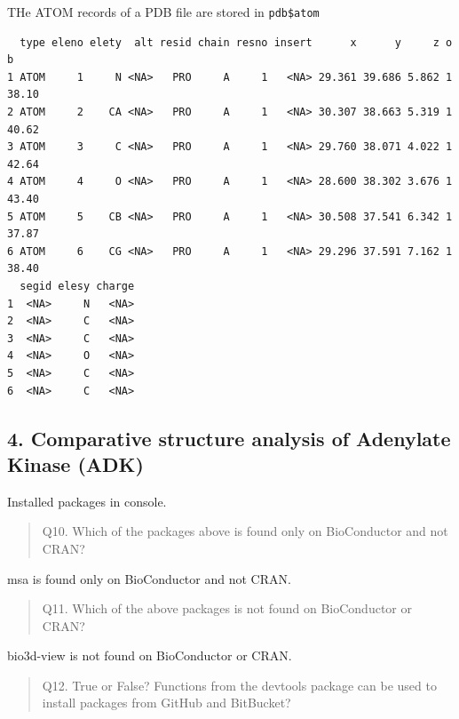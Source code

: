 \documentclass[
  letterpaper,
  DIV=11,
  numbers=noendperiod]{scrartcl}
\newenvironment{Shaded}{\begin{snugshade}}{\end{snugshade}}
\newcommand{\FunctionTok}[1]{\textcolor[rgb]{0.28,0.35,0.67}{#1}}
\newcommand{\NormalTok}[1]{\textcolor[rgb]{0.00,0.23,0.31}{#1}}
\newcommand{\SpecialCharTok}[1]{\textcolor[rgb]{0.37,0.37,0.37}{#1}}
\begin{document}
THe ATOM records of a PDB file are stored in \texttt{pdb\$atom}

\begin{Shaded}
\end{Shaded}

\begin{verbatim}
  type eleno elety  alt resid chain resno insert      x      y     z o     b
1 ATOM     1     N <NA>   PRO     A     1   <NA> 29.361 39.686 5.862 1 38.10
2 ATOM     2    CA <NA>   PRO     A     1   <NA> 30.307 38.663 5.319 1 40.62
3 ATOM     3     C <NA>   PRO     A     1   <NA> 29.760 38.071 4.022 1 42.64
4 ATOM     4     O <NA>   PRO     A     1   <NA> 28.600 38.302 3.676 1 43.40
5 ATOM     5    CB <NA>   PRO     A     1   <NA> 30.508 37.541 6.342 1 37.87
6 ATOM     6    CG <NA>   PRO     A     1   <NA> 29.296 37.591 7.162 1 38.40
  segid elesy charge
1  <NA>     N   <NA>
2  <NA>     C   <NA>
3  <NA>     C   <NA>
4  <NA>     O   <NA>
5  <NA>     C   <NA>
6  <NA>     C   <NA>
\end{verbatim}

\hypertarget{comparative-structure-analysis-of-adenylate-kinase-adk}{%
\subsection{4. Comparative structure analysis of Adenylate Kinase
(ADK)}\label{comparative-structure-analysis-of-adenylate-kinase-adk}}

Installed packages in console.

\begin{quote}
Q10. Which of the packages above is found only on BioConductor and not
CRAN?
\end{quote}

msa is found only on BioConductor and not CRAN.

\begin{quote}
Q11. Which of the above packages is not found on BioConductor or CRAN?
\end{quote}

bio3d-view is not found on BioConductor or CRAN.

\begin{quote}
Q12. True or False? Functions from the devtools package can be used to
install packages from GitHub and BitBucket?
\end{quote}
\end{document}
